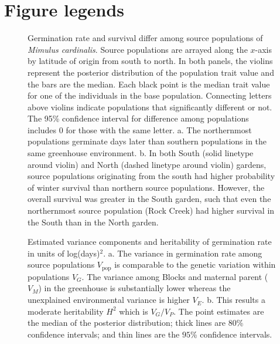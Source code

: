 \documentclass[
  12pt,
]{article}
\begin{document}
\hypertarget{figure-legends}{%
\section{Figure legends}\label{figure-legends}}

\begin{figure} [ht]
  \caption{Germination rate and survival differ among source populations of \textit{Mimulus cardinalis}. Source populations are arrayed along the $x$-axis by latitude of origin from south to north. In both panels, the violins represent the posterior distribution of the population trait value and the bars are the median. Each black point is the median trait value for one of the individuals in the base population. Connecting letters above violins indicate populations that significantly different or not. The 95\% confidence interval for difference among populations includes 0 for those with the same letter. a. The northernmost populations germinate days later than southern populations in the same greenhouse environment. b. In both South (solid linetype around violin) and North (dashed linetype around violin) gardens, source populations originating from the south had higher probability of winter survival than northern source populations. However, the overall survival was greater in the South garden, such that even the northernmost source population (Rock Creek) had higher survival in the South than in the North garden.}
\end{figure}

\begin{figure}[ht]
  \caption{Estimated variance components and heritability of germination rate in units of log(days)$^2$. a. The variance in germination rate among source populations $V_\text{pop}$ is comparable to the genetic variation within populations $V_G$. The variance among Blocks and maternal parent ($V_M$) in the greenhouse is substantially lower whereas the unexplained environmental variance is higher $V_E$. b. This results a moderate heritability $H^2$ which is $V_G / V_P$. The point estimates are the median of the posterior distribution; thick lines are $80$\% confidence intervals; and thin lines are the $95$\% confidence intervals.}
  \label{fig:h2-germ}
\end{figure}
\end{document}
